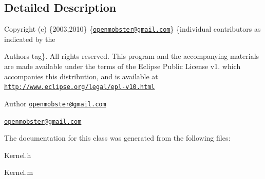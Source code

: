 \subsection{\-Detailed \-Description}
\-Copyright (c) \{2003,2010\} \{\href{mailto:openmobster@gmail.com}{\tt openmobster@gmail.\-com}\} \{individual contributors as indicated by the \begin{DoxyAuthor}{\-Authors}
tag\}. \-All rights reserved. \-This program and the accompanying materials are made available under the terms of the \-Eclipse \-Public \-License v1. which accompanies this distribution, and is available at \href{http://www.eclipse.org/legal/epl-v10.html}{\tt http\-://www.\-eclipse.\-org/legal/epl-\/v10.\-html}
\end{DoxyAuthor}
\begin{DoxyAuthor}{\-Author}
\href{mailto:openmobster@gmail.com}{\tt openmobster@gmail.\-com}

\href{mailto:openmobster@gmail.com}{\tt openmobster@gmail.\-com} 
\end{DoxyAuthor}


\-The documentation for this class was generated from the following files\-:\begin{DoxyCompactItemize}
\item 
\-Kernel.\-h\item 
\-Kernel.\-m\end{DoxyCompactItemize}
